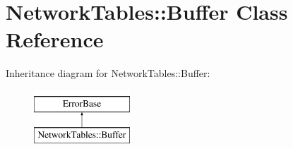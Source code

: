 \hypertarget{classNetworkTables_1_1Buffer}{
\section{NetworkTables::Buffer Class Reference}
\label{classNetworkTables_1_1Buffer}
}
Inheritance diagram for NetworkTables::Buffer:\begin{figure}[H]
\begin{center}
\leavevmode
\includegraphics[height=2.000000cm]{classNetworkTables_1_1Buffer}
\end{center}
\end{figure}

